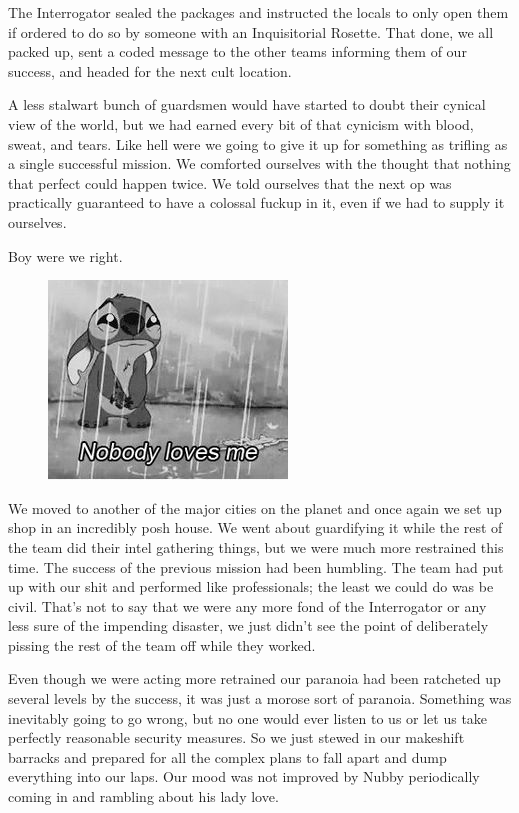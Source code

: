The Interrogator sealed the packages and instructed the locals to only open them if ordered to do so by someone with an Inquisitorial Rosette. 
That done, we all packed up, sent a coded message to the other teams informing them of our success, and headed for the next cult location.

A less stalwart bunch of guardsmen would have started to doubt their cynical view of the world, but we had earned every bit of that cynicism with blood, sweat, and tears. 
Like hell were we going to give it up for something as trifling as a single successful mission. 
We comforted ourselves with the thought that nothing that perfect could happen twice. 
We told ourselves that the next op was practically guaranteed to have a colossal fuckup in it, even if we had to supply it ourselves.

Boy were we right.

\begin{figure}
	\begin{center}
		\includegraphics[width=\figwidth]{pics/5/10.png}
	\end{center}
\end{figure}
We moved to another of the major cities on the planet and once again we set up shop in an incredibly posh house. 
We went about guardifying it while the rest of the team did their intel gathering things, but we were much more restrained this time. 
The success of the previous mission had been humbling. 
The team had put up with our shit and performed like professionals; the least we could do was be civil. 
That’s not to say that we were any more fond of the Interrogator or any less sure of the impending disaster, we just didn’t see the point of deliberately pissing the rest of the team off while they worked. 

Even though we were acting more retrained our paranoia had been ratcheted up several levels by the success, it was just a morose sort of paranoia. 
Something was inevitably going to go wrong, but no one would ever listen to us or let us take perfectly reasonable security measures. 
So we just stewed in our makeshift barracks and prepared for all the complex plans to fall apart and dump everything into our laps. 
Our mood was not improved by Nubby periodically coming in and rambling about his lady love.

